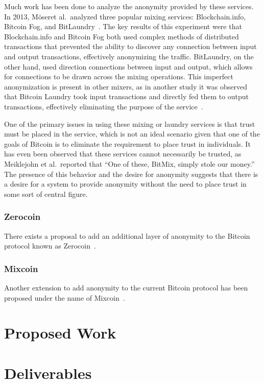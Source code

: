 \documentclass[11pt]{article}
\newcommand{\Moser}{M{\"o}ser}
\begin{document}

Much work has been done to analyze the anonymity provided by these services.
In 2013, \Moser et al.\ analyzed three popular mixing services: Blockchain.info,
Bitcoin Fog, and BitLaundry~\cite{moser13}. The key results of this experiment
were that Blockchain.info and Bitcoin Fog both used complex methods of
distributed transactions that prevented the ability to discover any connection
between input and output transactions, effectively anonymizing the traffic.
BitLaundry, on the other hand, used direction connections between input and
output, which allows for connections to be drawn across the mixing operations.
This imperfect anonymization is present in other mixers, as in another study it
was observed that Bitcoin Laundry took input transactions and directly fed them
to output transactions, effectively eliminating the purpose of the
service~\cite{meiklejohn13}.

One of the primary issues in using these mixing or laundry services is that
trust must be placed in the service, which is not an ideal scenario given that
one of the goals of Bitcoin is to eliminate the requirement to place trust in
individuals. It has even been observed that these services cannot necessarily be
trusted, as Meiklejohn et al.\ reported that ``One of these, BitMix, simply
stole our money.'' The presence of this behavior and the desire for anonymity
suggests that there is a desire for a system to provide anonymity without the
need to place trust in some sort of central figure.

\subsubsection{Zerocoin}
There exists a proposal to add an additional layer of anonymity to the Bitcoin
protocol known as Zerocoin~\cite{miers13}.
\subsubsection{Mixcoin}
Another extension to add anonymity to the current Bitcoin protocol has been
proposed under the name of Mixcoin~\cite{bonneau14}.

\section{Proposed Work}

\section{Deliverables}


\end{document}
